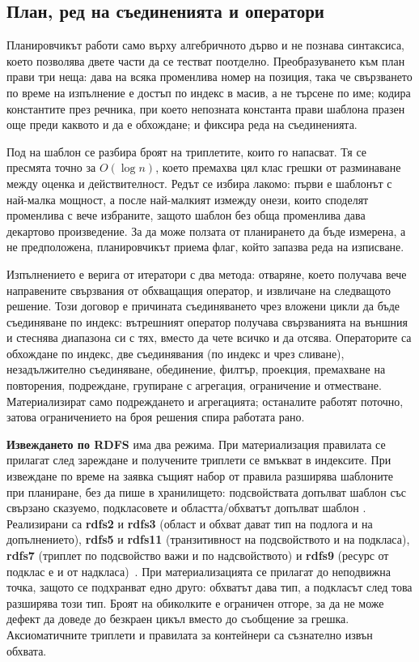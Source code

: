\subsection{План, ред на съединенията и оператори}

Планировчикът работи само върху алгебричното дърво и не познава синтаксиса, което позволява
двете части да се тестват поотделно. Преобразуването към план прави три неща: дава на всяка
променлива номер на позиция, така че свързването по време на изпълнение е достъп по индекс в
масив, а не търсене по име; кодира константите през речника, при което непозната константа
прави шаблона празен още преди каквото и да е обхождане; и фиксира реда на съединенията.

Под  на шаблон се разбира броят на триплетите, които го напасват. Тя се пресмята
точно за $O(\log n)$, което премахва цял клас грешки от разминаване между оценка и
действителност. Редът се избира лакомо: първи е шаблонът с най-малка мощност, а после
най-малкият измежду онези, които споделят променлива с вече избраните, защото шаблон без обща
променлива дава декартово произведение. За да може ползата от планирането да бъде измерена, а
не предположена, планировчикът приема флаг, който запазва реда на изписване.

Изпълнението е верига от итератори с два метода: отваряне, което получава вече направените
свързвания от обхващащия оператор, и извличане на следващото решение. Този договор е причината
съединяването чрез вложени цикли да бъде съединяване по индекс: вътрешният оператор получава
свързванията на външния и стеснява диапазона си с тях, вместо да чете всичко и да отсява.
Операторите са обхождане по индекс, две съединявания (по индекс и чрез сливане), незадължително
съединяване, обединение, филтър, проекция, премахване на повторения, подреждане, групиране с
агрегация, ограничение и отместване. Материализират само подреждането и агрегацията; останалите
работят поточно, затова ограничението на броя решения спира работата рано.

\textbf{Извеждането по RDFS} има два режима. При материализация правилата се прилагат след
зареждане и получените триплети се вмъкват в индексите. При извеждане по време на заявка
същият набор от правила разширява шаблоните при планиране, без да пише в хранилището:
подсвойствата допълват шаблон със свързано сказуемо, подкласовете и областта/обхватът допълват
шаблон . Реализирани са \textbf{rdfs2} и \textbf{rdfs3}
(област и обхват дават тип на подлога и на допълнението), \textbf{rdfs5} и \textbf{rdfs11}
(транзитивност на подсвойството и на подкласа), \textbf{rdfs7} (триплет по подсвойство важи и
по надсвойството) и \textbf{rdfs9} (ресурс от подклас е и от надкласа)~\cite{w3c_rdf_schema}.
При материализацията се прилагат до неподвижна точка, защото се подхранват едно друго: обхватът
дава тип, а подкласът след това разширява този тип. Броят на обиколките е ограничен отгоре, за
да не може дефект да доведе до безкраен цикъл вместо до съобщение за грешка. Аксиоматичните
триплети и правилата за контейнери са съзнателно извън обхвата.

